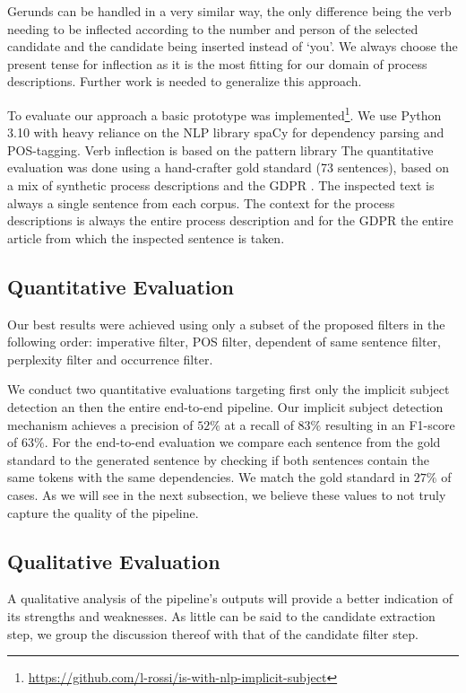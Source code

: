 \documentclass[times, 10pt,twocolumn]{article}
\begin{document}
Gerunds can be handled in a very similar way, the only difference being the verb needing to be
inflected according to the number and person of the selected candidate and the candidate being
inserted instead of `you'. We always choose
the present tense for inflection as it is the most fitting for our domain of process descriptions.
Further work is needed to generalize this approach.



To evaluate our approach a basic prototype was implemented\footnote{\url{https://github.com/l-rossi/is-with-nlp-implicit-subject}}.
We use Python 3.10 \cite{python} with heavy reliance on the NLP library 
spaCy \cite{spacy} for dependency parsing and POS-tagging. Verb inflection
is based on the pattern library \cite{pattern_library}
The quantitative evaluation was done using a hand-crafter gold standard (73 sentences),
based on a mix of synthetic process descriptions \cite{NLP_bpm_data} and the GDPR \cite{gdpr}.
The inspected text is always a single sentence from each corpus. The context for the process descriptions
is always the entire process description and for the GDPR the entire article from which the inspected sentence
is taken.

\subsection{Quantitative Evaluation}
Our best results were achieved using only a subset of the proposed filters in the following order:
imperative filter, POS filter, dependent of same sentence filter, perplexity filter and occurrence filter.

We conduct two quantitative evaluations targeting first only the implicit subject detection an then
the entire end-to-end pipeline. 
Our implicit subject detection mechanism achieves a precision of \(52\%\) at a recall of \(83\%\)
resulting in an F1-score of \(63\%\).
For the end-to-end evaluation we compare each sentence from the gold standard to the generated sentence
by checking if both sentences contain the same tokens with the same dependencies. We match the gold
standard in \(27\%\) of cases.
As we will see in the next subsection, we believe these values to not truly capture the quality
of the pipeline. 

\subsection{Qualitative Evaluation}
A qualitative analysis of the pipeline's outputs will provide a better indication of its strengths
and weaknesses. As little can be said to the candidate extraction step, we group the discussion
thereof with that of the candidate filter step.
\end{document}
